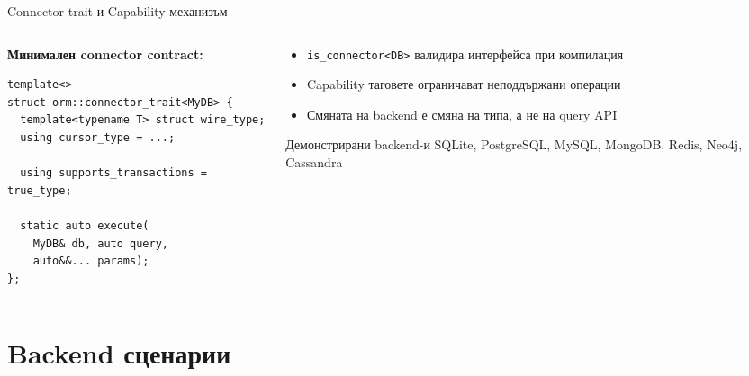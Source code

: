 \documentclass[aspectratio=169,12pt]{beamer}
\begin{document}
\begin{frame}[fragile]{Connector trait и Capability механизъм}
    \begin{columns}[T]
        \begin{column}{0.52\textwidth}
            \textbf{Минимален connector contract:}
\begin{lstlisting}
template<>
struct orm::connector_trait<MyDB> {
  template<typename T> struct wire_type;
  using cursor_type = ...;

  using supports_transactions = true_type;

  static auto execute(
    MyDB& db, auto query,
    auto&&... params);
};
\end{lstlisting}
        \end{column}
        \begin{column}{0.45\textwidth}
            \begin{itemize}\small
                \item \texttt{is\_connector<DB>} валидира интерфейса при компилация
                \item Capability таговете ограничават неподдържани операции
                \item Смяната на backend е смяна на типа, а не на query API
            \end{itemize}
            \vspace{0.15em}
            \begin{block}{Демонстрирани backend-и}
                {\small SQLite, PostgreSQL, MySQL, MongoDB, Redis, Neo4j, Cassandra}
            \end{block}
        \end{column}
    \end{columns}
\end{frame}

\section{Backend сценарии}
\end{document}
